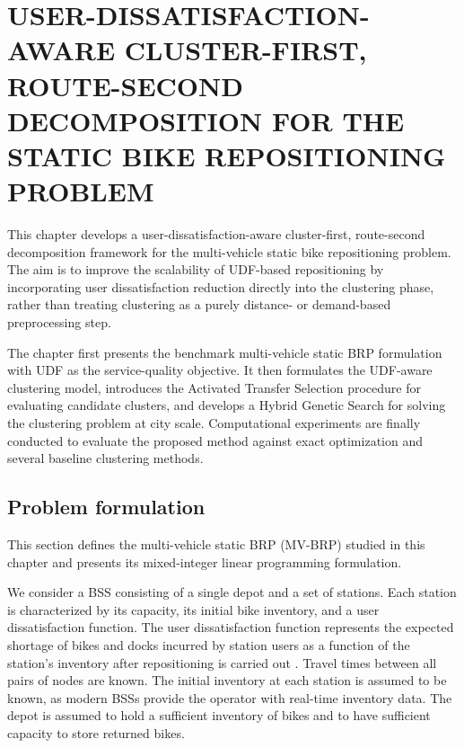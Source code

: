 \chapter[UDF-AWARE STATIC BRP DECOMPOSITION]{USER-DISSATISFACTION-AWARE CLUSTER-FIRST, ROUTE-SECOND DECOMPOSITION FOR THE STATIC BIKE REPOSITIONING PROBLEM}

This chapter develops a user-dissatisfaction-aware cluster-first, route-second decomposition framework for the multi-vehicle static bike repositioning problem. The aim is to improve the scalability of UDF-based repositioning by incorporating user dissatisfaction reduction directly into the clustering phase, rather than treating clustering as a purely distance- or demand-based preprocessing step.

The chapter first presents the benchmark multi-vehicle static BRP formulation with UDF as the service-quality objective. It then formulates the UDF-aware clustering model, introduces the Activated Transfer Selection procedure for evaluating candidate clusters, and develops a Hybrid Genetic Search for solving the clustering problem at city scale. Computational experiments are finally conducted to evaluate the proposed method against exact optimization and several baseline clustering methods.

\section{Problem formulation}\label{ch3:sec:problem-formulation}

This section defines the multi-vehicle static BRP (MV-BRP) studied in this chapter and presents its mixed-integer linear programming formulation.

We consider a BSS consisting of a single depot and a set of stations. Each station is characterized by its capacity, its initial bike inventory, and a user dissatisfaction function. The user dissatisfaction function represents the expected shortage of bikes and docks incurred by station users as a function of the station's inventory after repositioning is carried out \citep{ravivOptimalInventoryManagement2013}. Travel times between all pairs of nodes are known. The initial inventory at each station is assumed to be known, as modern BSSs provide the operator with real-time inventory data. The depot is assumed to hold a sufficient inventory of bikes and to have sufficient capacity to store returned bikes.

